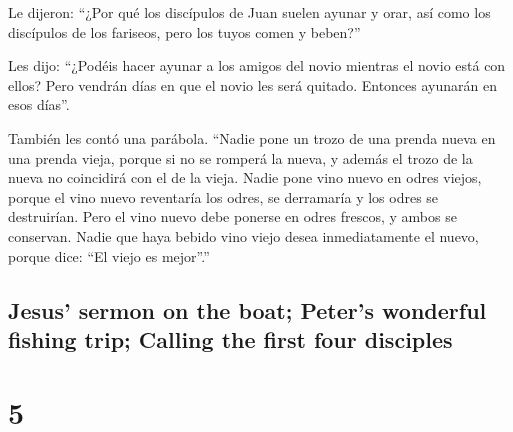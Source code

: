 \begin{paracol}{2}
 Le dijeron: ``¿Por qué los discípulos de Juan suelen
ayunar y orar, así como los discípulos de los fariseos, pero los tuyos
comen y beben?''

 Les dijo: ``¿Podéis hacer ayunar a los amigos del novio
mientras el novio está con ellos?  Pero vendrán días en
que el novio les será quitado. Entonces ayunarán en esos días''.

 También les contó una parábola. ``Nadie pone un trozo de
una prenda nueva en una prenda vieja, porque si no se romperá la nueva,
y además el trozo de la nueva no coincidirá con el de la vieja.
 Nadie pone vino nuevo en odres viejos, porque el vino
nuevo reventaría los odres, se derramaría y los odres se destruirían.
 Pero el vino nuevo debe ponerse en odres frescos, y
ambos se conservan.  Nadie que haya bebido vino viejo
desea inmediatamente el nuevo, porque dice: ``El viejo es mejor''.''

\switchcolumn
\begin{otherlanguage}{english}

\hypertarget{jesus-sermon-on-the-boat-peters-wonderful-fishing-trip-calling-the-first-four-disciples}{%
\subsection{Jesus' sermon on the boat; Peter's wonderful fishing trip;
Calling the first four
disciples}\label{jesus-sermon-on-the-boat-peters-wonderful-fishing-trip-calling-the-first-four-disciples}}

\hypertarget{section-9}{%
\section{5}\label{section-9}}


\end{otherlanguage}
\end{paracol}
